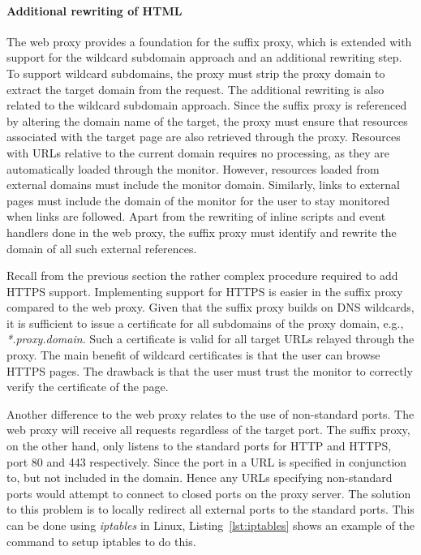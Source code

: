 \documentclass{llncs}
\begin{document}
\paragraph{Additional rewriting of HTML}


The web proxy provides a foundation for the suffix proxy, which is extended
with support for the wildcard subdomain approach and an additional rewriting step. 
To support wildcard subdomains, the proxy must strip the proxy domain to extract 
the target domain from the request. 
The additional rewriting is also related to the wildcard subdomain approach.
Since the suffix proxy is referenced by altering the domain name of the target, 
the proxy must ensure that resources associated with the target page are also 
retrieved through the proxy. Resources with URLs relative to the current domain 
requires no processing, as they are automatically loaded through the monitor. 
However, resources loaded from external domains must 
include the monitor domain. Similarly, links to external pages must include the domain of the monitor 
for the user to stay %
monitored %
when links are followed.
Apart from the rewriting of inline 
scripts and event handlers done in the web proxy, the suffix proxy must 
identify and rewrite the domain of all such external references. 


Recall from the previous section the rather complex procedure required to add HTTPS support.
Implementing support for HTTPS is easier in the suffix proxy compared to the web proxy. 
Given that the suffix proxy builds on DNS wildcards, it is sufficient to issue a certificate
for all subdomains of the proxy domain, e.g., \emph{*.proxy.domain}. Such a 
certificate is valid for all target URLs relayed through the proxy.
The main benefit of wildcard certificates is that the user can browse HTTPS pages. 
The drawback is that the user must trust the monitor to correctly verify the 
certificate of the page.

Another difference to the web proxy relates to the use of non-standard ports.
The web proxy will receive all requests regardless of the target port. The 
suffix proxy, on the other hand, only listens to the standard ports for HTTP and HTTPS, port 80 and 
443 respectively. Since the port in a URL is specified in conjunction to, but not included in the domain.
Hence any URLs specifying non-standard ports would attempt to connect to closed 
ports on the proxy server. The solution to this problem is to locally redirect 
all external ports to the standard ports. This can be done using \emph{iptables} in Linux, 
Listing~\ref{lst:iptables} shows an example of the command to setup iptables to do this.
\end{document}
